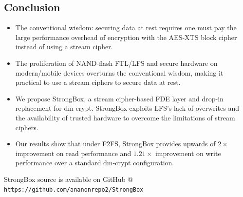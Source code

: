 \documentclass[a0,portrait]{a0poster}
\begin{document}
\begin{multicols}{2}
\section*{Conclusion}

\begin{itemize}

\item The conventional wisdom: securing data at rest requires one must pay the
large performance overhead of encryption with the AES-XTS block cipher instead
of using a stream cipher.

\item The proliferation of NAND-flash FTL/LFS and secure hardware on
modern/mobile devices overturns the conventional wisdom, making it practical to
use a stream ciphers to secure data at rest.

\item We propose StrongBox, a stream cipher-based FDE layer and drop-in
replacement for dm-crypt. StrongBox exploits LFS’s lack of overwrites and the
availability of trusted hardware to overcome the limitations of stream ciphers.

\item Our results show that under F2FS, StrongBox provides upwards of
$2\times$ improvement on read performance and $1.21\times$ improvement on write
performance over a standard dm-crypt configuration.

\end{itemize}

\color{DarkSlateGray} %


\printbibliography 


\end{multicols}

\begin{minipage}[b]{\linewidth}
\vspace{1cm}
\noindent\makebox[\linewidth]{\rule{0.9\paperwidth}{0.4pt}}
StrongBox source is available on GitHub @ \texttt{https://github.com/ananonrepo2/StrongBox}
\end{minipage}
\end{document}
